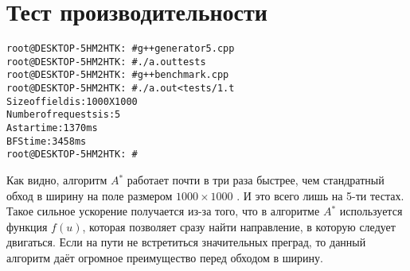 \section{Тест производительности}

\begin{alltt}
root@DESKTOP-5HM2HTK:~# g++ generator5.cpp
root@DESKTOP-5HM2HTK:~# ./a.out tests
root@DESKTOP-5HM2HTK:~# g++ benchmark.cpp
root@DESKTOP-5HM2HTK:~# ./a.out <tests/1.t
Size of field is: 1000 X 1000
Number of requests is: 5
A star time: 1370ms
BFS time: 3458ms
root@DESKTOP-5HM2HTK:~#
\end{alltt}

Как видно, алгоритм $A$$^*$ работает почти в три раза быстрее, чем стандратный обход в ширину на поле размером $1000 \times 1000$ . И это всего лишь на 5-ти тестах. Такое сильное ускорение получается из-за того, что в алгоритме $A$$^*$ используется функция $f(u)$, которая позволяет сразу найти направление, в которую следует двигаться. Если на пути не встретиться значительных преград, то данный алгоритм даёт огромное преимущество перед обходом в ширину.

\pagebreak

